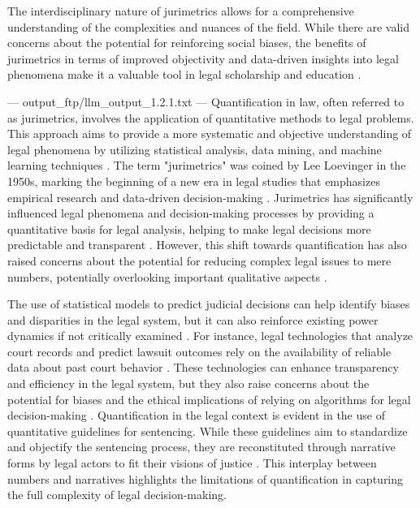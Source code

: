 The interdisciplinary nature of jurimetrics allows for a comprehensive understanding of the complexities and nuances of the field. While there are valid concerns about the potential for reinforcing social biases, the benefits of jurimetrics in terms of improved objectivity and data-driven insights into legal phenomena make it a valuable tool in legal scholarship and education \cite{10.1057/s41599-020-00557-0,10.5040/9781350220645}.


---
output_ftp/llm_output_1.2.1.txt
---
Quantification in law, often referred to as jurimetrics, involves the application of quantitative methods to legal problems. This approach aims to provide a more systematic and objective understanding of legal phenomena by utilizing statistical analysis, data mining, and machine learning techniques \cite{loevinger1959}. The term "jurimetrics" was coined by Lee Loevinger in the 1950s, marking the beginning of a new era in legal studies that emphasizes empirical research and data-driven decision-making \cite{loevinger1959}. Jurimetrics has significantly influenced legal phenomena and decision-making processes by providing a quantitative basis for legal analysis, helping to make legal decisions more predictable and transparent \cite{ribeiro2021quantification}. However, this shift towards quantification has also raised concerns about the potential for reducing complex legal issues to mere numbers, potentially overlooking important qualitative aspects \cite{ribeiro2021quantification}.

The use of statistical models to predict judicial decisions can help identify biases and disparities in the legal system, but it can also reinforce existing power dynamics if not critically examined \cite{101017_s0003975609000150}. For instance, legal technologies that analyze court records and predict lawsuit outcomes rely on the availability of reliable data about past court behavior \cite{ribeiro2021quantification}. These technologies can enhance transparency and efficiency in the legal system, but they also raise concerns about the potential for biases and the ethical implications of relying on algorithms for legal decision-making \cite{silva2023role}. Quantification in the legal context is evident in the use of quantitative guidelines for sentencing. While these guidelines aim to standardize and objectify the sentencing process, they are reconstituted through narrative forms by legal actors to fit their visions of justice \cite{10_1111_lsi_12334}. This interplay between numbers and narratives highlights the limitations of quantification in capturing the full complexity of legal decision-making.

